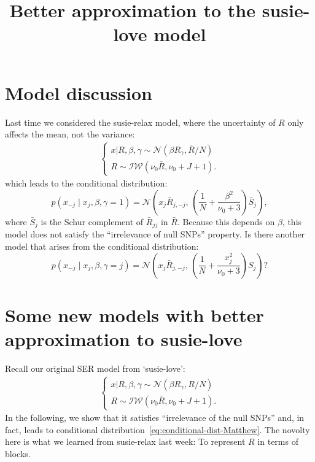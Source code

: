 \documentclass[11pt]{article}
\title{Better approximation to the susie-love model}
\author{}
\date{}
\newcommand{\Normal}{\mathcal N}
\begin{document}
\maketitle


\section{Model discussion}
Last time we considered the susie-relax model, where the uncertainty of $R$ only affects the mean, not the variance:
\begin{align}\label{eq:model-susie-relax} 
\begin{cases}
x | R, \beta, \gamma \sim \mathcal{N}(\beta R_{\gamma}, \bar R / N)\\
R \sim \mathcal{IW}(\nu_0 \bar R, \nu_0 + J + 1).
\end{cases}
\end{align}
which leads to the conditional distribution:
\begin{equation}\label{eq:conditional-dist-susie-relax}
p(x_{-j}\mid x_j, \beta, \gamma=1) = 
\Normal\left(
x_j \bar R_{j, -j} ,\,
\left(\frac{1}{N}+ \dfrac{\beta^2}{\nu_0 + 3}\right) \bar S_j
\right),
\end{equation}
where $\bar S_j$ is the Schur complement of $\bar R_{jj}$ in $\bar R$.
Because this depends on $\beta$, this model does not satisfy the ``irrelevance of null SNPs'' property. 
Is there another model that arises from the conditional distribution:
\begin{equation}\label{eq:conditional-dist-Matthew}
p(x_{-j}\mid x_j, \beta, \gamma=j) = 
\Normal\left(
x_j \bar R_{j, -j} ,\,
\left(\frac{1}{N}+ \dfrac{x_j^2}{\nu_0 + 3}\right)S_j
\right)?
\end{equation}

\section{Some new models with better approximation to susie-love}
Recall our original SER model from `susie-love':
\begin{align}\label{eq:likelihood-x-R-mean-var} 
\begin{cases}
x | R, \beta, \gamma \sim \mathcal{N}(\beta R_{\gamma}, R / N)\\
R \sim \mathcal{IW}(\nu_0 \bar R, \nu_0 + J + 1).
\end{cases}
\end{align}
In the following, we show that it satisfies ``irrelevance of the null SNPs'' and, in fact, leads to conditional distribution~\eqref{eq:conditional-dist-Matthew}. The novolty here is what we learned from susie-relax last week: To represent $R$ in terms of blocks.
\end{document}
